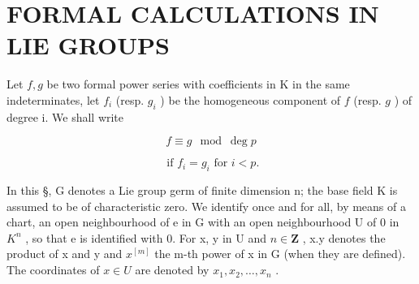 \section{FORMAL CALCULATIONS IN LIE GROUPS}

Let \(f, g\) be two formal power series with coefficients in K in the same indeterminates, let \(f_i\) (resp. \(g_i\) ) be the homogeneous component of \(f\) (resp. \(g\) ) of degree i. We shall write

\[
f \equiv g \mod \deg p
\]

\[
\text { if } f _ {i} = g _ {i} \text { for } i <   p.
\]

In this §, G denotes a Lie group germ of finite dimension n; the base field K is assumed to be of characteristic zero. We identify once and for all, by means of a chart, an open neighbourhood of e in G with an open neighbourhood U of 0 in \(K^{n}\) , so that e is identified with 0. For x, y in U and \(n \in \mathbf{Z}\) , x.y denotes the product of x and y and \(x^{[m]}\) the m-th power of x in G (when they are defined). The coordinates of \(x \in U\) are denoted by \(x_{1}, x_{2}, \ldots, x_{n}\) .

